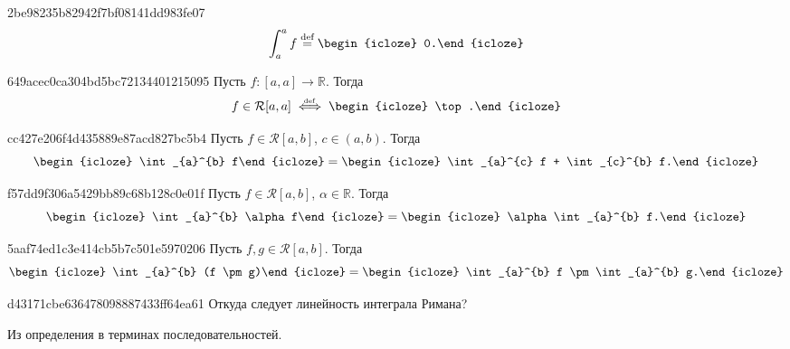 \begin{note}{2be98235b82942f7bf08141dd983fe07}
    \[
        \int_{a}^{a} f \overset{\text{def}}= \begin{icloze}{1}0.\end{icloze}
    \]
\end{note}

\begin{note}{649acec0ca304bd5bc72134401215095}
    Пусть \({ f : [a, a] \to \mathbb R }\). Тогда
    \[
        f \in \mathcal R[a, a] \overset{\hspace{-1pt}\text{\tiny def}}\iff \begin{icloze}{1}\top.\end{icloze}
    \]
\end{note}

\begin{note}{cc427e206f4d435889e87acd827bc5b4}
    Пусть \({ f \in \mathcal R[a, b] }\),  \({ c \in (a, b) }\).
    Тогда
    \[
        \begin{icloze}{2}\int_{a}^{b} f\end{icloze} = \begin{icloze}{1}\int_{a}^{c} f + \int_{c}^{b} f.\end{icloze}
    \]
\end{note}

\begin{note}{f57dd9f306a5429bb89c68b128c0e01f}
    Пусть \({ f \in \mathcal R[a, b] }\), \({ \alpha \in \mathbb R }\).
    Тогда
    \[
        \begin{icloze}{2}\int_{a}^{b} \alpha f\end{icloze} = \begin{icloze}{1}\alpha \int_{a}^{b} f.\end{icloze}
    \]
\end{note}

\begin{note}{5aaf74ed1c3e414cb5b7c501e5970206}
    Пусть \({ f, g \in \mathcal R[a, b] }\).
    Тогда
    \[
        \begin{icloze}{2}\int_{a}^{b} (f \pm g)\end{icloze} = \begin{icloze}{1}\int_{a}^{b} f \pm \int_{a}^{b} g.\end{icloze}
    \]
\end{note}

\begin{note}{d43171cbe636478098887433ff64ea61}
    Откуда следует линейность интеграла Римана?

    \begin{cloze}{1}
        Из определения в терминах последовательностей.
    \end{cloze}
\end{note}


